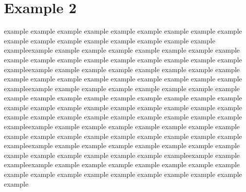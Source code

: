 \section{Example 2}
example example example example example example example example example\newline
example example example example example example example example example\newline example example example example example example example example example\newline
example example example example example example example example example\newline example example example example example example example example example\newline
example example example example example example example example example\newline example example example example example example example example example\newline
example example example example example example example example example\newline
example example example example example example example example example\newline
example example example example example example example example example\newline example example example example example example example example example\newline
example example example example example example example example example\newline example example example example example example example example example\newline
example example example example example exampleexample example example\newline example example example example example example example example example\newline
example example example example example example example example example\newline